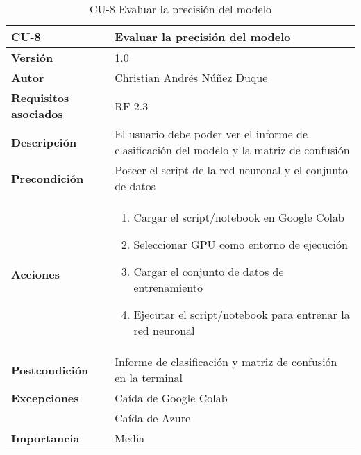\begin{table}[p]
	\centering
	\begin{tabularx}{\linewidth}{ p{} p{} }
		\toprule
		\textbf{CU-8}    & \textbf{Evaluar la precisión del modelo}\\
		\toprule
		\textbf{Versión}              & 1.0    \\
		\textbf{Autor}                & Christian Andrés Núñez Duque \\
		\textbf{Requisitos asociados} & RF-2.3 \\
		\textbf{Descripción}          & El usuario debe poder ver el informe de clasificación del modelo y la matriz de confusión \\
		\textbf{Precondición}         & Poseer el script de la red neuronal y el conjunto de datos \\
		\textbf{Acciones}             &
		\begin{enumerate}
			\def\labelenumi{\arabic{enumi}.}
			\tightlist
			\item Cargar el script/notebook en Google Colab
			\item Seleccionar GPU como entorno de ejecución
			\item Cargar el conjunto de datos de entrenamiento
			\item Ejecutar el script/notebook para entrenar la red neuronal
		\end{enumerate}\\
		\textbf{Postcondición}        & Informe de clasificación y matriz de confusión en la terminal \\
		\textbf{Excepciones}          & Caída de Google Colab \\ & Caída de Azure \\
		\textbf{Importancia}          & Media \\
		\bottomrule
	\end{tabularx}
	\caption{CU-8 Evaluar la precisión del modelo}
\end{table}

